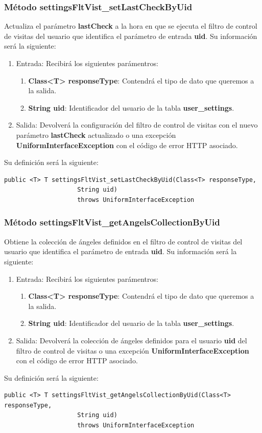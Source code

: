 \subsubsection{Método settingsFltVist\_setLastCheckByUid}
Actualiza el parámetro \textbf{lastCheck} a la hora en que se ejecuta el filtro de control de visitas del usuario que identifica el parámetro de entrada \textbf{uid}. Su información será la siguiente:
\begin{enumerate}
\item Entrada: Recibirá los siguientes parámentros:
\begin{enumerate}
\item \textbf{Class<T> responseType}: Contendrá el tipo de dato que queremos a la salida. 
\item \textbf{String uid}: Identificador del usuario de la tabla \textbf{user\_settings}.
\end{enumerate}
\item Salida: Devolverá la configuración del filtro de control de visitas con el nuevo parámetro \textbf{lastCheck} actualizado o una excepción \textbf{UniformInterfaceException} con el código de error HTTP asociado.
\end{enumerate}
\bigskip
\par
Su definición será la siguiente:
\begin{verbatim}public <T> T settingsFltVist_setLastCheckByUid(Class<T> responseType, 
					String uid) 
					throws UniformInterfaceException\end{verbatim}

\subsubsection{Método settingsFltVist\_getAngelsCollectionByUid}
Obtiene la colección de ángeles definidos en el filtro de control de visitas del usuario que identifica el parámetro de entrada \textbf{uid}. Su información será la siguiente:
\begin{enumerate}
\item Entrada: Recibirá los siguientes parámentros:
\begin{enumerate}
\item \textbf{Class<T> responseType}: Contendrá el tipo de dato que queremos a la salida. 
\item \textbf{String uid}: Identificador del usuario de la tabla \textbf{user\_settings}.
\end{enumerate}
\item Salida: Devolverá la colección de ángeles definidos para el usuario \textbf{uid} del filtro de control de visitas o una excepción \textbf{UniformInterfaceException} con el código de error HTTP asociado.
\end{enumerate}
\bigskip
\par
Su definición será la siguiente:
\begin{verbatim}public <T> T settingsFltVist_getAngelsCollectionByUid(Class<T> responseType, 
					String uid) 
					throws UniformInterfaceException \end{verbatim}


